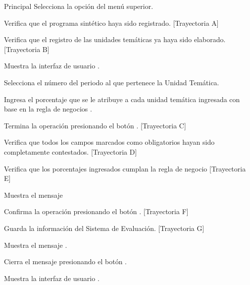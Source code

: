 \begin{UCtrayectoria}{Principal}
    \UCpaso[\UCactor] Selecciona la opción  del menú superior.
    
    \UCpaso Verifica que el programa sintético haya sido registrado. [Trayectoria A]
    
    \UCpaso Verifica que el registro de las unidades temáticas ya haya sido elaborado. [Trayectoria B]
    
    \UCpaso Muestra la interfaz de usuario .
    
	\UCpaso[\UCactor] Selecciona el número del periodo al que pertenece la Unidad Temática.
	
	\UCpaso[\UCactor] Ingresa el porcentaje que se le atribuye a cada unidad temática ingresada con base en la regla de negocios .
	
	\UCpaso[\UCactor] Termina la operación presionando el botón . [Trayectoria C]
        
    \UCpaso Verifica que todos los campos marcados como obligatorios hayan sido completamente contestados. [Trayectoria D]
    
    \UCpaso Verifica que los porcentajes ingresados cumplan la regla de negocio  [Trayectoria E]
    
    \UCpaso Muestra el mensaje 

    \UCpaso[\UCactor] Confirma la operación presionando el botón . [Trayectoria F]
    
    \UCpaso Guarda la información del Sistema de Evaluación. [Trayectoria G]
    
    \UCpaso Muestra el mensaje .
    
    \UCpaso[\UCactor] Cierra el mensaje presionando el botón .
    
    \UCpaso Muestra la interfaz de usuario .
\end{UCtrayectoria}


